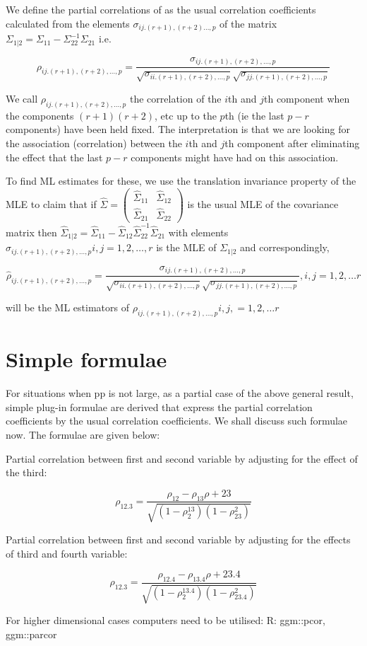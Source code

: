 \documentclass[11pt]{article}
\begin{document}
We define the partial correlations of  as the usual correlation coefficients
calculated from the elements $\sigma_{ij.(r+1),(r+2)\dots,p}$ of the matrix
$\Sigma_{1|2} = \Sigma_{11} - \Sigma_{22}^{-1} \Sigma_{21}$ i.e.

\[
    \rho_{ij.(r+1),(r+2),\dots,p} = \dfrac{\sigma_{ij.(r+1),(r+2),\dots,p}}{\sqrt{\sigma_{ii.(r+1),(r+2),\dots,p}}\sqrt{\sigma_{jj.(r+1),(r+2),\dots,p}}}
\]

We call $\rho_{ij.(r+1),(r+2),\dots,p}$ the correlation of the $i$th and $j$th
component when the components $(r+1)(r+2)$, etc up to the $p$th (ie the last
$p-r$ components) have been held fixed.
The interpretation is that we are looking for the association (correlation)
between the $i$th and $j$th component after eliminating the effect that the
last $p-r$ components might have had on this association.

To find ML estimates for these, we use the translation invariance property of
the MLE to claim that if $\hat{\Sigma} = \begin{pmatrix} \hat{\Sigma}_{11} & \hat{\Sigma}_{12} \\ \hat{\Sigma}_{21} & \hat{\Sigma}_{22}  \end{pmatrix}$
is the usual MLE of the covariance matrix then $\hat{\Sigma}_{1|2} = \hat{\Sigma}_{11} - \hat{\Sigma}_{12} \hat{\Sigma}_{22}^{-1} \hat{\Sigma}_{21}$
with elements $\hat{\sigma}_{ij.(r+1),(r+2),\dots,p} i,j = 1,2,\dots, r$
is the MLE of $\Sigma_{1|2}$ and correspondingly,

\[
    \hat{\rho}_{ij.(r+1),(r+2),\dots,p} = \dfrac{\sigma_{ij.(r+1),(r+2),\dots,p}}{\sqrt{\sigma_{ii.(r+1),(r+2),\dots,p}}\sqrt{\sigma_{jj.(r+1),(r+2),\dots,p}}} , i, j = 1,2, \dots r
\]

will be the ML estimators of $\rho_{ij.(r+1),(r+2),\dots,p} i, j, = 1, 2, \dots r$

\section{Simple formulae}\label{sec:simple-formulae}

For situations when pp is not large, as a partial case of the above general
result, simple plug-in formulae are derived that express the partial
correlation coefficients by the usual correlation coefficients.
We shall discuss such formulae now.
The formulae are given below:

Partial correlation between first and second variable by adjusting
for the effect of the third:

\[
\rho_{12.3} = \dfrac{\rho_{12} - \rho_{13}\rho+{23}}{\sqrt{(1 - \rho_{2}^{13})(1 - \rho_{23}^{2})}}
\]

Partial correlation between first and second variable by adjusting
for the effects of third and fourth variable:

\[
\rho_{12.3} = \dfrac{\rho_{12.4} - \rho_{13.4}\rho+{23.4}}{\sqrt{(1 - \rho_{2}^{13.4})(1 - \rho_{23.4}^{2})}}
\]

For higher dimensional cases computers need to be utilised:
R: ggm::pcor, ggm::parcor
\end{document}
